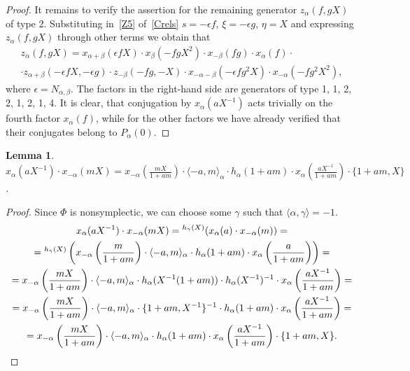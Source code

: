 \documentclass[oneside, 8pt]{amsart}
\newtheorem{lemma}{Lemma}
\theoremstyle{remark}
\theoremstyle{definition}
\numberwithin{equation}{section}
\begin{document}
\begin{proof}
It remains to verify the assertion for the remaining generator $z_\alpha(f, gX)$ of type 2. Substituting in~\eqref{Z5} of~\cref{Crels} $s = -\epsilon f$, $\xi = -\epsilon g$, $\eta=X$ and expressing $z_\alpha(f, gX)$ through other terms we obtain that
\begin{multline} \nonumber
 z_\alpha(f, gX) = 
 x_{\alpha+\beta}(\epsilon f X) \cdot
 x_{\beta}(-f gX^2) \cdot
 x_{-\beta}(f g) \cdot
 x_\alpha(f) \cdot \\ \cdot
 z_{\alpha+\beta}(-\epsilon fX, -\epsilon g) \cdot 
 z_{-\beta}(-fg, -X) \cdot
 x_{-\alpha-\beta}(-\epsilon f g^2 X) \cdot
 x_{-\alpha}(-fg^2X^2),
\end{multline}
where $\epsilon = N_{\alpha,\beta}$. 
The factors in the right-hand side are generators of type 1, 1, 2, 2, 1, 2, 1, 4. It is clear, that conjugation by $x_{\alpha}(aX^{-1})$ acts trivially on the fourth factor $x_\alpha(f)$, while for the other factors we have already verified that their conjugates belong to $P_{\alpha}(0)$. 
\end{proof}

\begin{lemma} \label{lem:Tulenbayev-formula}
 $x_\alpha(aX^{-1}) \cdot x_{-\alpha}(mX) = x_{-\alpha}\left(\frac{mX}{1+am}\right) \cdot \langle -a, m\rangle_\alpha \cdot h_\alpha(1+am) \cdot x_{\alpha}\left(\frac{aX^{-1}}{1+am}\right) \cdot \{1+am, X\}$.
\end{lemma}
\begin{proof}
Since $\Phi$ is nonsymplectic, we can choose some $\gamma$ such that $\langle \alpha, \gamma \rangle = -1$.
 \begin{multline*}
 x_\alpha(aX^{-1}) \cdot x_{-\alpha}(mX) %
 = {}^{h_\gamma(X)}(x_\alpha(a) \cdot x_{-\alpha}(m)) = \\
 = {}^{h_\gamma(X)}\left( x_{-\alpha}\left(\frac{m}{1+am}\right) \cdot \langle -a, m\rangle_\alpha \cdot h_\alpha(1+am) \cdot x_\alpha\left(\frac{a}{1+am}\right) \right) = \\
 = x_{-\alpha}\left(\frac{mX}{1+am}\right) \cdot \langle -a, m\rangle_\alpha \cdot h_\alpha(X^{-1}(1+am))\cdot h_\alpha(X^{-1})^{-1} \cdot x_{\alpha}\left(\frac{aX^{-1}}{1+am}\right) = \\
 = x_{-\alpha}\left(\frac{mX}{1+am}\right) \cdot \langle -a, m\rangle_\alpha \cdot \{1+am, X^{-1}\}^{-1} \cdot h_\alpha(1+am)\cdot x_{\alpha}\left(\frac{aX^{-1}}{1+am}\right) = \\
 = x_{-\alpha}\left(\frac{mX}{1+am}\right) \cdot \langle -a, m\rangle_\alpha \cdot h_\alpha(1+am) \cdot x_{\alpha}\left(\frac{aX^{-1}}{1+am}\right) \cdot \{1+am, X\}. \qedhere
\end{multline*}
\end{proof}
\end{document}
